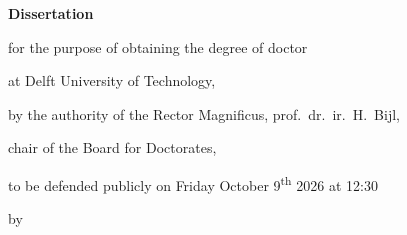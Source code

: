 \begin{titlepage}

\begin{center}

\vspace*{2\bigskipamount}

{\makeatletter
\titlestyle\bfseries\LARGE\@title
\makeatother}

{\makeatletter
\ifx\@subtitle\undefined\else
    \bigskip
    \titlefont\titleshape\Large\@subtitle
\fi
\makeatother}

\end{center}

\cleardoublepage
\thispagestyle{empty}

\begin{center}


\vspace*{2\bigskipamount}

{\makeatletter
\titlestyle\bfseries\LARGE\@title
\makeatother}

{\makeatletter
\ifx\@subtitle\undefined\else
    \bigskip
    \titlefont\titleshape\Large\@subtitle
\fi
\makeatother}

\vfill


{\Large\titlefont\bfseries Dissertation}

\bigskip
\bigskip

for the purpose of obtaining the degree of doctor

at Delft University of Technology,

by the authority of the Rector Magnificus, prof.~dr.~ir.~H.~Bijl,

chair of the Board for Doctorates,

to be defended publicly on Friday October 9\textsuperscript{th} 2026 at 12:30

\bigskip
\bigskip

by

\bigskip
\bigskip

\makeatletter
{\Large\titlefont\bfseries\@firstname\ {\titleshape\@lastname}}
\makeatother


\end{center}
\end{titlepage}
